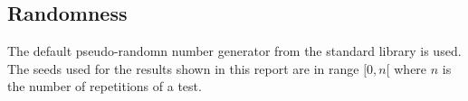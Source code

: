 \subsection{Randomness}

The default pseudo-randomn number generator from the  standard library is used.
The seeds used for the results shown in this report are in range $[0, n[$ where $n$ is the number of repetitions of a test.
